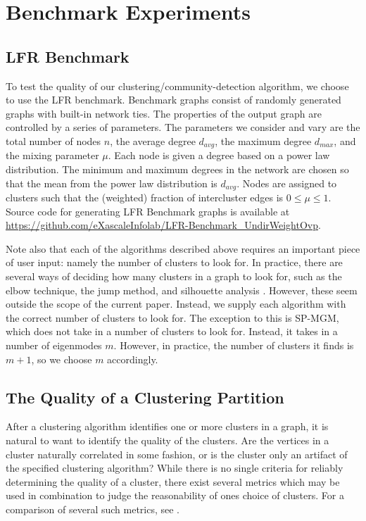 \documentclass[10pt,journal,compsoc]{IEEEtran} %
\theoremstyle{definition}
\begin{document}
\section{Benchmark Experiments}
\subsection{LFR Benchmark} To test the quality of our
clustering/community-detection algorithm, we choose to use the LFR
benchmark.  Benchmark graphs consist of randomly generated graphs with
built-in network ties.  The properties of the output graph are
controlled by a series of parameters. The parameters we consider and
vary are the total number of nodes $n$, the average degree $d_{avg}$,
the maximum degree $d_{max}$, and the mixing parameter $\mu$.  Each
node is given a degree based on a power law distribution.  The minimum
and maximum degrees in the network are chosen so that the mean from
the power law distribution is $d_{avg}$.  Nodes are assigned to
clusters such that the (weighted) fraction of intercluster edges is
$0\leq \mu \leq 1$.  Source code for generating LFR Benchmark graphs
is available at
\url{https://github.com/eXascaleInfolab/LFR-Benchmark_UndirWeightOvp}.

Note also that each of the algorithms described above requires an important piece of user input: namely the number of clusters to look for.  In practice, there are several ways of deciding how many clusters in a graph to look for, such as the elbow technique, the jump method, and silhouette analysis \cite{kodinariya2013review}.  However, these seem outside the scope of the current paper.  Instead, we supply each algorithm with the correct number of clusters to look for.  The exception to this is SP-MGM, which does not take in a number of clusters to look for.  Instead, it takes in a number of eigenmodes $m$.  However, in practice, the number of clusters it finds is $m+1$, so we choose $m$ accordingly.

\subsection{The Quality of a Clustering Partition} After a clustering
algorithm identifies one or more clusters in a graph, it is natural to
want to identify the quality of the clusters.  Are the vertices in a
cluster naturally correlated in some fashion, or is the cluster only
an artifact of the specified clustering algorithm?  While there is no
single criteria for reliably determining the quality of a cluster,
there exist several metrics which may be used in combination to judge
the reasonability of ones choice of clusters.  For a comparison of
several such metrics, see \cite{almeida2011there}.
\end{document}
